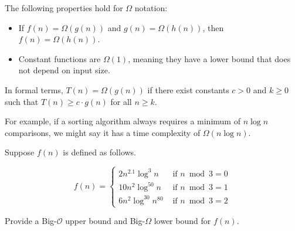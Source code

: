 The following properties hold for $\Omega$ notation:
\begin{itemize}
    \item If $f(n) = \Omega(g(n))$ and $g(n) = \Omega(h(n))$, then $f(n) = \Omega(h(n))$.
    \item Constant functions are $\Omega(1)$, meaning they have a lower bound that does not depend on input size.
\end{itemize}


In formal terms, $T(n) = \Omega(g(n))$ if there exist constants $c > 0$ and $k \geq 0$ such that $T(n) \geq c \cdot g(n)$ for all $n \geq k$.

For example, if a sorting algorithm always requires a minimum of $n \log n$ comparisons, we might say it has a time complexity of $\Omega(n \log n)$.

\begin{example}

    Suppose $f(n)$ is defined as follows.
    
    \[
    f(n)= \begin{cases}2 n^{2.1} \log ^3 n & \text { if } n \bmod 3=0 \\ 10 n^2 \log ^{50} n & \text { if } n \bmod 3=1 \\ 6 n^2 \log ^{30} n^{80} & \text { if } n \bmod 3=2\end{cases}
    \]
    
    
    Provide a Big-$\mathcal{O}$ upper bound and Big-$\Omega$ lower bound for $f(n)$.
    \end{example}
    

